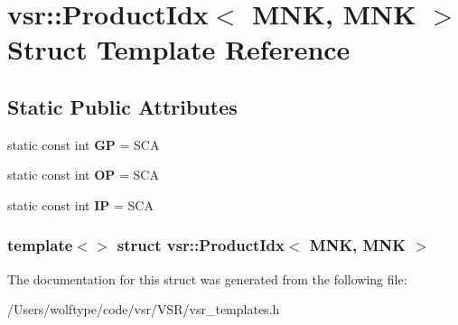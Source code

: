 \hypertarget{structvsr_1_1_product_idx_3_01_m_n_k_00_01_m_n_k_01_4}{\section{vsr\-:\-:Product\-Idx$<$ M\-N\-K, M\-N\-K $>$ Struct Template Reference}
\label{structvsr_1_1_product_idx_3_01_m_n_k_00_01_m_n_k_01_4}
}
\subsection*{Static Public Attributes}
\begin{DoxyCompactItemize}
\item 
\hypertarget{structvsr_1_1_product_idx_3_01_m_n_k_00_01_m_n_k_01_4_a5db85b8660d66afeb50d883bc7b04167}{static const int {\bfseries G\-P} = S\-C\-A}\label{structvsr_1_1_product_idx_3_01_m_n_k_00_01_m_n_k_01_4_a5db85b8660d66afeb50d883bc7b04167}

\item 
\hypertarget{structvsr_1_1_product_idx_3_01_m_n_k_00_01_m_n_k_01_4_a93b168d7ff611f781fca7198bd1f70ae}{static const int {\bfseries O\-P} = S\-C\-A}\label{structvsr_1_1_product_idx_3_01_m_n_k_00_01_m_n_k_01_4_a93b168d7ff611f781fca7198bd1f70ae}

\item 
\hypertarget{structvsr_1_1_product_idx_3_01_m_n_k_00_01_m_n_k_01_4_a1ad77db4a3d9799bb1a163afde21247a}{static const int {\bfseries I\-P} = S\-C\-A}\label{structvsr_1_1_product_idx_3_01_m_n_k_00_01_m_n_k_01_4_a1ad77db4a3d9799bb1a163afde21247a}

\end{DoxyCompactItemize}
\subsubsection*{template$<$$>$ struct vsr\-::\-Product\-Idx$<$ M\-N\-K, M\-N\-K $>$}



The documentation for this struct was generated from the following file\-:\begin{DoxyCompactItemize}
\item 
/\-Users/wolftype/code/vsr/\-V\-S\-R/vsr\-\_\-templates.\-h\end{DoxyCompactItemize}
